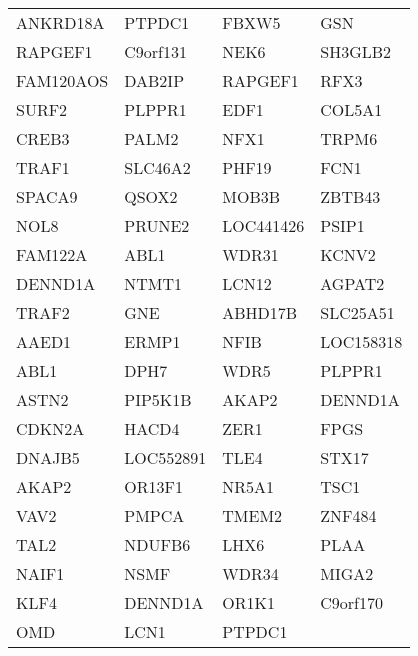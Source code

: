 {\begin{longtable}{llll}
ANKRD18A&PTPDC1&FBXW5&GSN\tabularnewline
RAPGEF1&C9orf131&NEK6&SH3GLB2\tabularnewline
FAM120AOS&DAB2IP&RAPGEF1&RFX3\tabularnewline
SURF2&PLPPR1&EDF1&COL5A1\tabularnewline
CREB3&PALM2&NFX1&TRPM6\tabularnewline
TRAF1&SLC46A2&PHF19&FCN1\tabularnewline
SPACA9&QSOX2&MOB3B&ZBTB43\tabularnewline
NOL8&PRUNE2&LOC441426&PSIP1\tabularnewline
FAM122A&ABL1&WDR31&KCNV2\tabularnewline
DENND1A&NTMT1&LCN12&AGPAT2\tabularnewline
TRAF2&GNE&ABHD17B&SLC25A51\tabularnewline
AAED1&ERMP1&NFIB&LOC158318\tabularnewline
ABL1&DPH7&WDR5&PLPPR1\tabularnewline
ASTN2&PIP5K1B&AKAP2&DENND1A\tabularnewline
CDKN2A&HACD4&ZER1&FPGS\tabularnewline
DNAJB5&LOC552891&TLE4&STX17\tabularnewline
AKAP2&OR13F1&NR5A1&TSC1\tabularnewline
VAV2&PMPCA&TMEM2&ZNF484\tabularnewline
TAL2&NDUFB6&LHX6&PLAA\tabularnewline
NAIF1&NSMF&WDR34&MIGA2\tabularnewline
KLF4&DENND1A&OR1K1&C9orf170\tabularnewline
OMD&LCN1&PTPDC1&\tabularnewline
\bottomrule
\end{longtable}}
\addtocounter{table}{-1}
